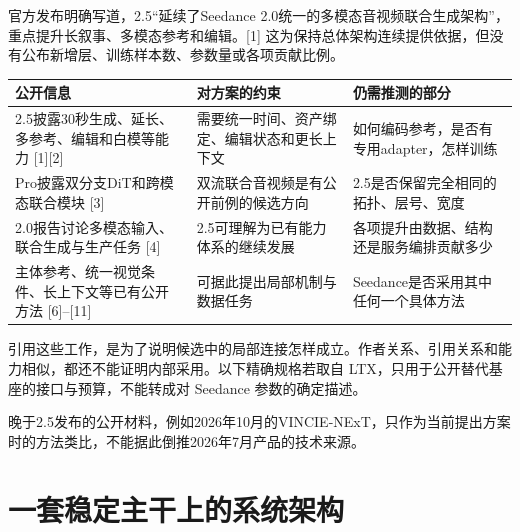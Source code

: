 官方发布明确写道，2.5``延续了Seedance 2.0统一的多模态音视频联合生成架构''，重点提升长叙事、多模态参考和编辑。{[}1{]} 这为保持总体架构连续提供依据，但没有公布新增层、训练样本数、参数量或各项贡献比例。

{\def\LTcaptype{table} %
\small\setlength{\tabcolsep}{3pt}\renewcommand{\arraystretch}{1.18}
\begin{longtable}[]{@{}
  >{\raggedright\arraybackslash}p{}
  >{\raggedright\arraybackslash}p{}
  >{\raggedright\arraybackslash}p{}@{}}
\toprule\noalign{}
\begin{minipage}[b]{\linewidth}\raggedright
公开信息
\end{minipage} & \begin{minipage}[b]{\linewidth}\raggedright
对方案的约束
\end{minipage} & \begin{minipage}[b]{\linewidth}\raggedright
仍需推测的部分
\end{minipage} \\
\midrule\noalign{}
\endhead
\bottomrule\noalign{}
\endlastfoot
2.5披露30秒生成、延长、多参考、编辑和白模等能力 {[}1{]}{[}2{]} & 需要统一时间、资产绑定、编辑状态和更长上下文 & 如何编码参考，是否有专用adapter，怎样训练 \\
1.5 Pro披露双分支DiT和跨模态联合模块 {[}3{]} & 双流联合音视频是有公开前例的候选方向 & 2.5是否保留完全相同的拓扑、层号、宽度 \\
2.0报告讨论多模态输入、联合生成与生产任务 {[}4{]} & 2.5可理解为已有能力体系的继续发展 & 各项提升由数据、结构还是服务编排贡献多少 \\
主体参考、统一视觉条件、长上下文等已有公开方法 {[}6{]}--{[}11{]} & 可据此提出局部机制与数据任务 & Seedance是否采用其中任何一个具体方法 \\
\end{longtable}
}

引用这些工作，是为了说明候选中的局部连接怎样成立。作者关系、引用关系和能力相似，都还不能证明内部采用。以下精确规格若取自 LTX，只用于公开替代基座的接口与预算，不能转成对 Seedance 参数的确定描述。

晚于2.5发布的公开材料，例如2026年10月的VINCIE-NExT，只作为当前提出方案时的方法类比，不能据此倒推2026年7月产品的技术来源。

\section{一套稳定主干上的系统架构}\label{seedance-m27-ux4e00ux5957ux7a33ux5b9aux4e3bux5e72ux4e0aux7684ux7cfbux7edfux67b6ux6784}

